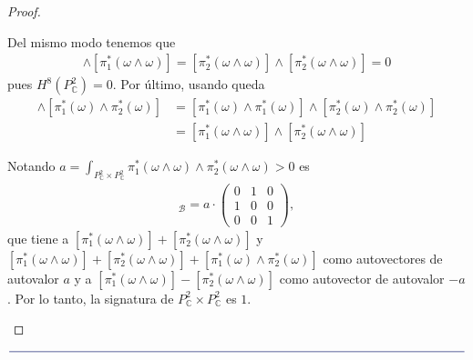 \documentclass[11pt]{article}
\newcommand{\C}{\mathbb{C}}
\newcommand{\paint}[1]{\color{color}{#1}}
\newcommand{\paintline}{\begin{center}
$\paint{
\rule{400pt}{0.5pt}
}$
\vspace{10pt}
\end{center}}
\begin{document}
\begin{proof}
\begin{itemize}[listparindent = \parindent]
\begin{itemize}[listparindent = \parindent]
Del mismo modo tenemos que 
\begin{align*}
[\pi_1^*(\omega \wedge \omega)] \wedge [\pi_1^*(\omega \wedge \omega)] = [\pi_2^*(\omega \wedge \omega)] \wedge [\pi_2^*(\omega \wedge \omega)] = 0
\end{align*}
pues $H^8(P_\C^2) = 0$. Por último, usando queda
\begin{align*}
 [\pi_1^*(\omega) \wedge \pi_2^*(\omega)] \wedge  [\pi_1^*(\omega) \wedge \pi_2^*(\omega)] &=  [\pi_1^*(\omega) \wedge \pi_1^*(\omega)] \wedge  [\pi_2^*(\omega) \wedge \pi_2^*(\omega)]\\
 &= [\pi_1^*(\omega \wedge \omega)] \wedge  [\pi_2^*(\omega \wedge \omega)]
\end{align*}

Notando $a = \int_{P_\C^2 \times P_\C^2} \pi_1^*(\omega \wedge \omega) \wedge  \pi_2^*(\omega \wedge \omega) > 0$ es
\begin{align*}
[\beta]_{\mathscr{B}} = a \cdot \begin{pmatrix}
0 & 1 & 0\\
1 & 0 & 0\\
0 & 0 & 1
\end{pmatrix},
\end{align*}
                                                                                                                                                                                                                                                                                        que tiene a $ [\pi_1^*(\omega \wedge \omega)] + [\pi_2^*(\omega \wedge \omega)]$ y $ [\pi_1^*(\omega \wedge \omega)] + [\pi_2^*(\omega \wedge \omega)] + [\pi_1^*(\omega) \wedge \pi_2^*(\omega)]$ como autovectores de autovalor $a$ y a $ [\pi_1^*(\omega \wedge \omega)] - [\pi_2^*(\omega \wedge \omega)]$ como autovector de autovalor $-a$. Por lo tanto, la signatura de $P_\C^2 \times P_\C^2$ es $1$.
\end{itemize}
\end{itemize}
\end{proof}

\paintline
\end{document}
